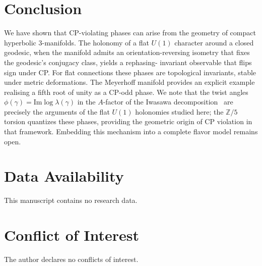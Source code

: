 \documentclass[12pt]{article}
\theoremstyle{definition}
\theoremstyle{remark}
\begin{document}
\section{Conclusion}

We have shown that CP-violating phases can arise from the geometry of
compact hyperbolic $3$-manifolds.  The holonomy of a flat $U(1)$ character
around a closed geodesic, when the manifold admits an orientation-reversing
isometry that fixes the geodesic’s conjugacy class, yields a rephasing-
invariant observable that flips sign under CP.  For flat connections these
phases are topological invariants, stable under metric deformations.
The Meyerhoff manifold provides an explicit example realising a fifth
root of unity as a CP-odd phase.
We note that the twist angles $\phi(\gamma)=\mathrm{Im}\log\lambda(\gamma)$
in the $A$-factor of the Iwasawa decomposition~\cite{Gentry:CKM,Gentry:PMNS}
are precisely the arguments of the flat $U(1)$ holonomies studied here;
the $\mathbb{Z}/5$ torsion quantizes these phases, providing the geometric
origin of CP violation in that framework.
Embedding this mechanism into a complete flavor model remains open.

\section*{Data Availability}
This manuscript contains no research data.

\section*{Conflict of Interest}
The author declares no conflicts of interest.
\end{document}

